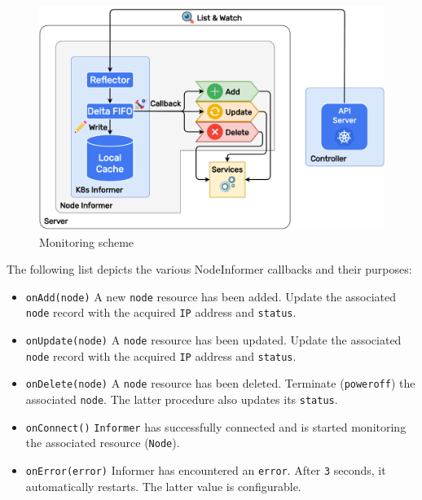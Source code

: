 \pagebreak


\begin{figure}[htbp]
  \centering
  \includegraphics[width=.75\textwidth]{images/implementation/informer.pdf}
  \caption{Monitoring scheme}
  \label{fig:informer}
\end{figure}

The following list depicts the various NodeInformer callbacks and their purposes:
\begin{itemize}
  \item \texttt{onAdd(node)}
    \newline
    A new \texttt{node} resource has been added.
    \newline
    Update the associated \texttt{node} record with the acquired \texttt{IP} address
    and \texttt{status}.

  \item \texttt{onUpdate(node)}
    \newline
    A \texttt{node} resource has been updated.
    \newline
    Update the associated \texttt{node} record with the acquired \texttt{IP} address
    and \texttt{status}.

  \item \texttt{onDelete(node)}
    \newline
    A \texttt{node} resource has been deleted.
    \newline
    Terminate (\texttt{poweroff}) the associated \texttt{node}. The latter
    procedure also updates its \texttt{status}.

  \item \texttt{onConnect()}
    \newline
    \texttt{Informer} has successfully connected and is started monitoring the associated
    resource (\texttt{Node}).

  \item \texttt{onError(error)}
    \newline
    Informer has encountered an \texttt{error}.
    \newline
    After \texttt{3} seconds, it automatically restarts. The latter value is
    configurable.
\end{itemize}

